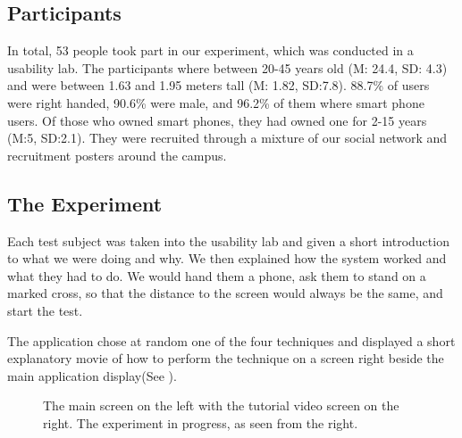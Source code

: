 \subsection{Participants}
In total, 53 people took part in our experiment, which was conducted in a usability lab. 
The participants where between 20-45 years old (M: 24.4, SD: 4.3) and were between 1.63 and 1.95 meters tall (M: 1.82, SD:7.8). 
88.7\% of users were right handed, 90.6\% were male, and 96.2\% of them where smart phone users. 
Of those who owned smart phones, they had owned one for 2-15 years (M:5, SD:2.1). 
They were recruited through a mixture of our social network and recruitment posters around the campus. 

\subsection{The Experiment}

Each test subject was taken into the usability lab and given a short introduction to what we were doing and why. 
We then explained how the system worked and what they had to do. 
We would hand them a phone, ask them to stand on a marked cross, so that the distance to the screen would always be the same, and start the test.

The application chose at random one of the four techniques and displayed a short explanatory movie of how to perform the technique on a screen right beside the main application display(See ).

\begin{figure}[H]
	\centering
	\caption{
		\protect{} The main screen on the left with the tutorial video screen on the right.
		\protect{} The experiment in progress, as seen from the right. 
	}
	\label{fig:setup}
\end{figure} 

